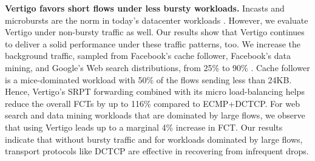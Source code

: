 \textbf{Vertigo favors short flows under less bursty workloads.}
Incasts and microbursts are the norm in today's datacenter workloads \cite{bullet, wild, social, high-resolution, jupiter}. However, we evaluate Vertigo under non-bursty traffic as well. 
Our results show that Vertigo continues to deliver a solid performance under these traffic patterns, too. 
We increase the background traffic, sampled from Facebook's cache follower, Facebook's data mining, and Google's Web search distributions, from 25\% to 90\% \cite{social, dctcp}. Cache follower is a mice-dominated workload with 50\% of the flows sending less than 24KB.
Hence, Vertigo's SRPT forwarding combined with its micro load-balancing helps reduce the overall FCTs by up to 116\% compared to ECMP+DCTCP. 
For web search and data mining workloads that are dominated by large flows, we observe that using Vertigo leads up to a marginal 4\% increase in FCT.
Our results indicate that without bursty traffic and for workloads dominated by large flows, transport protocols like DCTCP are effective in recovering from infrequent drops. %


